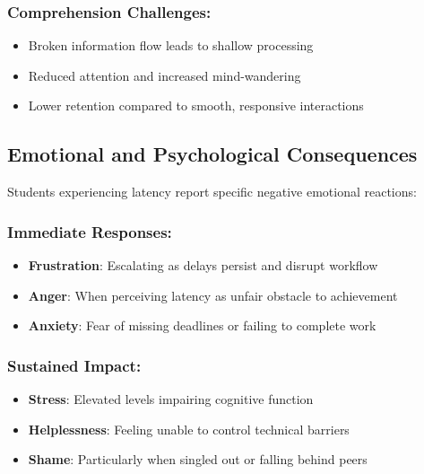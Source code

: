 \subsubsection{Comprehension Challenges:}

\begin{itemize}
	\item Broken information flow leads to shallow processing \supercite{Craik1972LevelsOfProcessing}
	\item Reduced attention and increased mind-wandering \supercite{Smallwood2011MindWandering}
	\item Lower retention compared to smooth, responsive interactions \supercite{Kintsch1998Comprehension}
\end{itemize}

\subsection{Emotional and Psychological Consequences}\label{emotional-and-psychological-consequences}

Students experiencing  latency report specific negative emotional reactions:

\subsubsection{Immediate Responses:}

\begin{itemize}
	\item \textbf{Frustration}: Escalating as delays persist and disrupt workflow \supercite{Lazarus1991EmotionAndAdaptation}
	\item \textbf{Anger}: When perceiving latency as unfair obstacle to achievement \supercite{Fogg2003PersuasiveTechnology}
	\item \textbf{Anxiety}: Fear of missing deadlines or failing to complete work \supercite{Zeidner1998TestAnxiety}
\end{itemize}


\subsubsection{Sustained Impact:}

\begin{itemize}
	\item \textbf{Stress}: Elevated levels impairing cognitive function \supercite{Sapolsky2004WhyZebrasDontGetUlcers}
	\item \textbf{Helplessness}: Feeling unable to control technical barriers \supercite{Seligman1975Helplessness}
	\item \textbf{Shame}: Particularly when singled out or falling behind peers \supercite{Brown2010TheGiftsOfImperfection}
\end{itemize}


